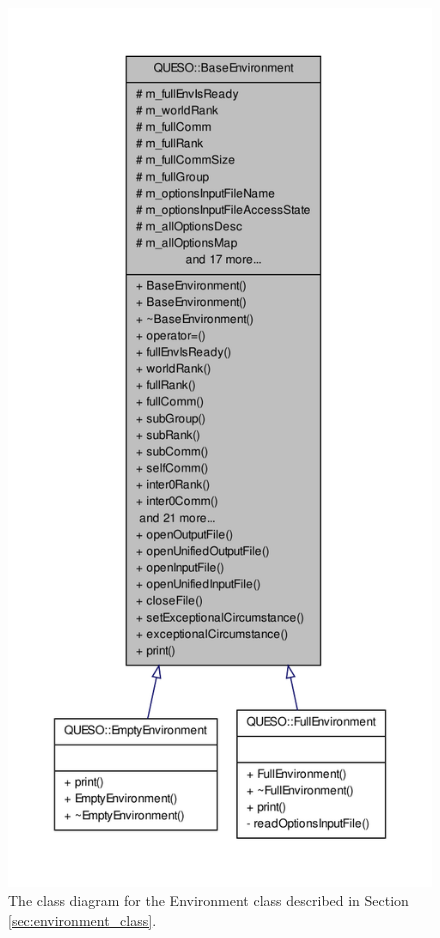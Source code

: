 \begin{figure}[!hp]
\centering
\includegraphics[scale=0.80,clip=true]{rawfigs/base_env_class.pdf}
\vspace*{-1.2cm}
\caption{The class diagram for the {Environment} class described in Section \ref{sec:environment_class}.}
\label{fig-env-class}
\end{figure}

